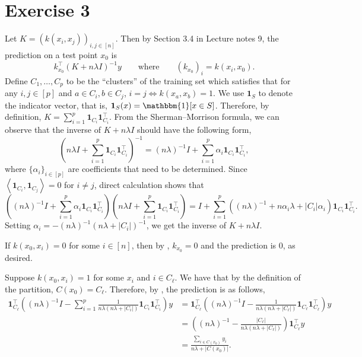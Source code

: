 \documentclass[11pt]{article}
\theoremstyle{plain}
\theoremstyle{definition}
\theoremstyle{remark}
\newcommand{\ind}{\mathbbm{1}}
\newcommand{\allone}{\mathbf{1}}
\newcommand{\tuple}[1]{\left(#1\right)}
\newcommand{\inner}[2]{\left\langle #1,#2\right\rangle}
\newcommand{\tp}{\tuple}
\begin{document}
\section*{Exercise 3}
Let $K = (k(x_i,x_j))_{i,j\in[n]}$. Then by Section 3.4 in Lecture notes 9, the prediction on a test point $x_0$ is 
\begin{equation}\label{eq:E3}
  k_{x_0}^\top (K+n\lambda I)^{-1}y\qquad \text{where}\qquad (k_{x_0})_i = k(x_i,x_0).
\end{equation}
Define $C_1,\ldots,C_p$ to be the ``clusters'' of the training set which satisfies that for any $i,j\in[p]$ and $a\in C_i,b\in C_j$, $i=j\iff k(x_a,x_b)=1$.
We use $\allone_S$ to denote the indicator vector, that is, $\allone_S(x) = \ind[x\in S]$.
Therefore, by definition, $K = \sum_{i=1}^p \allone_{C_i}\allone_{C_i}^\top$.
From the Sherman–Morrison formula, we can observe that the inverse of $K+n\lambda I$ should have the following form,
$$
  \tp{n\lambda I + \sum_{i=1}^p \allone_{C_i}\allone_{C_i}^\top}^{-1}
  = (n\lambda)^{-1} I + \sum_{i=1}^p \alpha_i\allone_{C_i}\allone_{C_i}^\top,
$$
where $\{\alpha_i\}_{i\in[p]}$ are coefficients that need to be determined.
Since $\inner{\allone_{C_i}}{\allone_{C_j}} = 0$ for $i\neq j$, direct calculation shows that
$$
  \tp{(n\lambda)^{-1} I + \sum_{i=1}^p \alpha_i\allone_{C_i}\allone_{C_i}^\top} \tp{n\lambda I + \sum_{i=1}^p \allone_{C_i}\allone_{C_i}^\top}
  = I + \sum_{i=1}^p ((n\lambda)^{-1}+n\alpha_i\lambda+|C_i|\alpha_i)\allone_{C_i}\allone_{C_i}^\top.
$$
Setting $\alpha_i = -(n\lambda)^{-1}(n\lambda + |C_i|)^{-1}$, we get the inverse of $K + n\lambda I$.

If $k(x_0,x_i) = 0$ for some $i\in[n]$, then by , $k_{x_0} = 0$ and the prediction is $0$, as desired.

Suppose $k(x_0,x_i)=1$ for some $x_i$ and $i\in C_\ell$.
We have that by the definition of the partition, $C(x_0) = C_\ell$.
Therefore, by , the prediction is as follows,
\begin{align*}
  \allone_{C_\ell}^\top \tp{(n\lambda)^{-1} I - \sum_{i=1}^p \frac{1}{n\lambda(n\lambda+|C_i|)}\allone_{C_i}\allone_{C_i}^\top}y
  &= \allone_{C_\ell}^\top \tp{(n\lambda)^{-1} I - \frac{1}{n\lambda(n\lambda+|C_\ell|)}\allone_{C_\ell}\allone_{C_\ell}^\top}y
  \\&=\tp{(n\lambda)^{-1} - \frac{|C_\ell|}{n\lambda(n\lambda+|C_\ell|)}}\allone_{C_\ell}^\top y
  \\&=\frac{\sum_{i\in C(x_0)}y_i}{n\lambda+|C(x_0)|} .
\end{align*}
\end{document}
